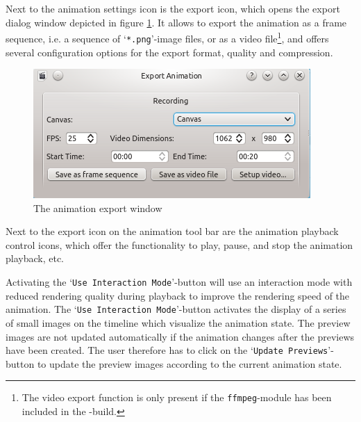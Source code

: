 Next to the animation settings icon is the export icon, which opens the export dialog window depicted in figure \ref{fig:animation_export}. 
It allows to export the animation as a frame sequence, i.e. a sequence of `\verb|*.png|'-image files, or as a video file\footnote{The video export function is only present if the \texttt{ffmpeg}-module has been included in the \Voreen-build.}, and offers several configuration
options for the export format, quality and compression.

\begin{figure}[!htb]
 \centering
 \includegraphics[scale=0.7,keepaspectratio=true]{./images/animation_export.png}
 \caption{The animation export window}
 \label{fig:animation_export}
\end{figure}

Next to the export icon on the animation tool bar are the animation playback control icons, which offer the functionality to play, pause, and stop the animation playback, etc.

Activating the `\verb|Use Interaction Mode|'-button will use an interaction mode with reduced rendering quality during playback to improve the rendering speed 
of the animation. The `\verb|Use Interaction Mode|'-button activates the display of a series of small images on the timeline which visualize the animation state.
The preview images are not updated automatically if the animation changes after the previews have been created. 
The user therefore has to click on the `\verb|Update Previews|'-button to update
the preview images according to the current animation state.


